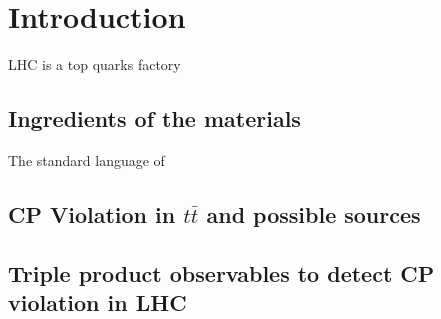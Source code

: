 

\section{Introduction}
\label{sec:Introduction}

	
	LHC is a top quarks factory

	\subsection{Ingredients of the materials}
	\label{ssec:IntroToSM}

		The standard language of 

	\subsection{CP Violation in $t\bar{t}$ and possible sources}
	\label{ssec:Intro_CPVpossible}

	\subsection{Triple product observables to detect CP violation in LHC}
	\label{ssec:Intro_TPinLHC}

\FloatBarrier
